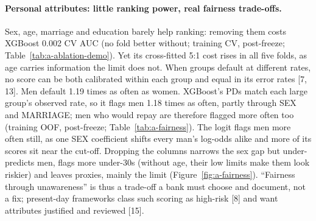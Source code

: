 \paragraph{Personal attributes: little ranking power, real fairness trade-offs.}
Sex, age, marriage and education barely help ranking: removing them costs XGBoost 0.002 CV AUC (no fold better without; training CV, post-freeze; Table~\ref{tab:a-ablation-demo}). Yet its cross-fitted 5:1 cost rises in all five folds, as age carries information the limit does not. When groups default at different rates, no score can be both calibrated within each group and equal in its error rates [7, 13]. Men default 1.19 times as often as women. XGBoost's PDs match each large group's observed rate, so it flags men 1.18 times as often, partly through SEX and MARRIAGE; men who would repay are therefore flagged more often too (training OOF, post-freeze; Table~\ref{tab:a-fairness}). The logit flags men more often still, as one SEX coefficient shifts every man's log-odds alike and more of its scores sit near the cut-off. Dropping the columns narrows the sex gap but under-predicts men, flags more under-30s (without age, their low limits make them look riskier) and leaves proxies, mainly the limit (Figure~\ref{fig:a-fairness}). ``Fairness through unawareness'' is thus a trade-off a bank must choose and document, not a fix; present-day frameworks class such scoring as high-risk [8] and want attributes justified and reviewed [15].
